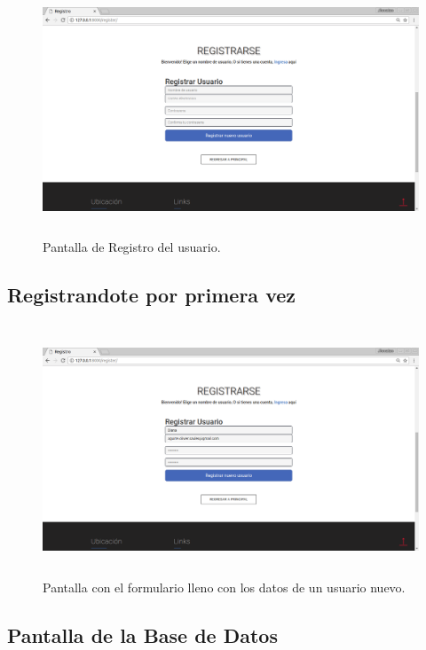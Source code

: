 			\begin{figure}[H]
			\centering
			\includegraphics[width=14cm, height=7.5cm]{./images/Implementacion/PantallaRegistro.png}
			\caption{Pantalla de Registro del usuario.}
			\label{fig:6-1-3} 
			\end{figure}

\subsection{Registrandote por primera vez}

			\begin{figure}[H]
			\centering
			\includegraphics[width=14cm, height=7.5cm]{./images/Implementacion/PantallaRegistro2.png}
			\caption{Pantalla con el formulario lleno con los datos de un usuario nuevo.}
			\label{fig:6-1-4} 
			\end{figure}

\subsection{Pantalla de la Base de Datos}

